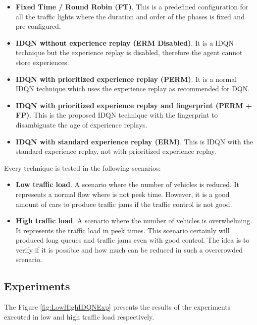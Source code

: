 \documentclass{llncs}
\begin{document}
\begin{itemize}
\item \textbf{Fixed Time / Round Robin (FT)}. This is a predefined configuration for all the traffic lights where the duration and order of the phases is fixed and pre configured.

\item \textbf{IDQN without experience replay (ERM Disabled)}. It is a IDQN technique but the experience replay is disabled, therefore the agent cannot store experiences.

\item \textbf{IDQN with prioritized experience replay (PERM)}. It is a normal IDQN technique which uses the experience replay as recommended for DQN.

\item \textbf{IDQN with prioritized experience replay and fingerprint (PERM + FP)}. This is the proposed IDQN technique with the fingerprint to disambiguate the age of experience replays.

\item \textbf{IDQN with standard experience replay (ERM)}. This is IDQN with the standard experience replay, not with prioritized experience replay.
\end{itemize}

Every technique is tested in the following scenarios:

\begin{itemize}
\item \textbf{Low traffic load}. A scenario where the number of vehicles is reduced. It represents a normal flow where is not peek time. However, it is a good amount of cars to produce traffic jams if the traffic control is not good.
\item \textbf{High traffic load}. A scenario where the number of vehicles is overwhelming. It represents the traffic load in peek times. This scenario certainly will produced long queues and traffic jams even with good control. The idea is to verify if it is possible and how much can be reduced in such a overcrowded scenario.
\end{itemize}

\subsection{Experiments}

The Figure \ref{fig:LowHighIDQNExp} presents the results of the experiments executed in low and high traffic load respectively.
\end{document}
